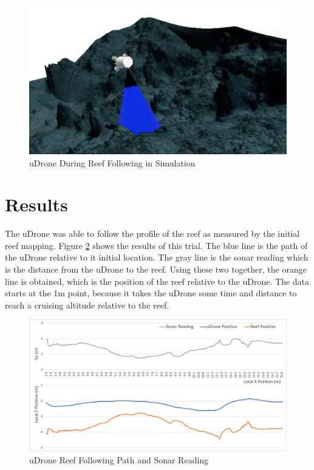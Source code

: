 \begin{figure}[ht]
\includegraphics[width=\maxwidth{\textwidth}]{img/follow_ss.png}
\caption{uDrone During Reef Following in Simulation}
\label{follow_ss}
\end{figure}

\section{Results}\label{pid-results}

The uDrone was able to follow the profile of the reef as measured by the initial reef mapping. Figure \ref{follow} shows the results of this trial. The blue line is the path of the uDrone relative to it initial location. The gray line is the sonar reading which is the distance from the uDrone to the reef. Using these two together, the orange line is obtained, which is the position of the reef relative to the uDrone. The data starts at the 1m point, because it takes the uDrone some time and distance to reach a cruising altitude relative to the reef. 

\begin{figure}[h]
\includegraphics[width=\maxwidth{\textwidth}]{img/follow.png}
\caption{uDrone Reef Following Path and Sonar Reading}
\label{follow}
\end{figure}

